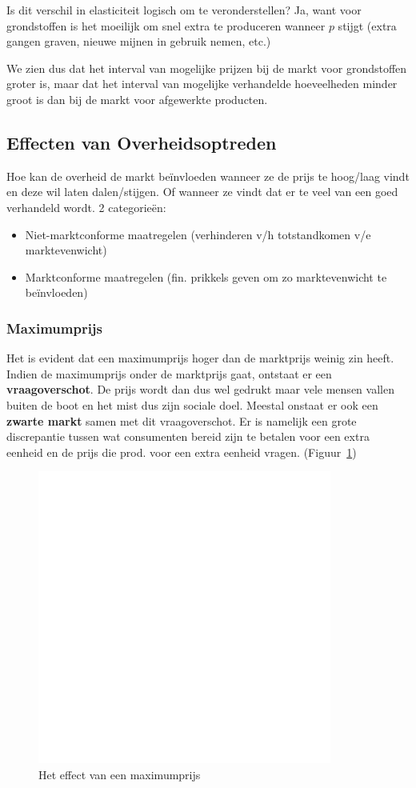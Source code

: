 Is dit verschil in elasticiteit logisch om te veronderstellen? Ja, want voor grondstoffen is het moeilijk om snel extra te produceren wanneer $p$ stijgt (extra gangen graven, nieuwe mijnen in gebruik nemen, etc.)

We zien dus dat het interval van mogelijke prijzen bij de markt voor grondstoffen groter is, maar dat het interval van mogelijke verhandelde hoeveelheden minder groot is dan bij de markt voor afgewerkte producten.



\subsection{Effecten van Overheidsoptreden}
Hoe kan de overheid de markt be\"invloeden wanneer ze de prijs te hoog/laag vindt en deze wil laten dalen/stijgen. Of wanneer ze vindt dat er te veel van een goed verhandeld wordt. 2 categorie\"en:
\begin{itemize}
	\item Niet-marktconforme maatregelen (verhinderen v/h totstandkomen v/e marktevenwicht)
    \item Marktconforme maatregelen (fin. prikkels geven om zo marktevenwicht te be\"invloeden)
\end{itemize}

\subsubsection{Maximumprijs}
Het is evident dat een maximumprijs hoger dan de marktprijs weinig zin heeft. Indien de maximumprijs onder de marktprijs gaat, ontstaat er een \textbf{vraagoverschot}. De prijs wordt dan dus wel gedrukt maar vele mensen vallen buiten de boot en het mist dus zijn sociale doel. Meestal onstaat er ook een \textbf{zwarte markt} samen met dit vraagoverschot. Er is namelijk een grote discrepantie tussen wat consumenten bereid zijn te betalen voor een extra eenheid en de prijs die prod. voor een extra eenheid vragen. (Figuur~\ref{fig:maximumprijs})
\begin{figure}[htbp]
	\centering
	\includegraphics[scale=0.4]{Images/white.png}
	\caption{Het effect van een maximumprijs}
	\label{fig:maximumprijs}
\end{figure}


